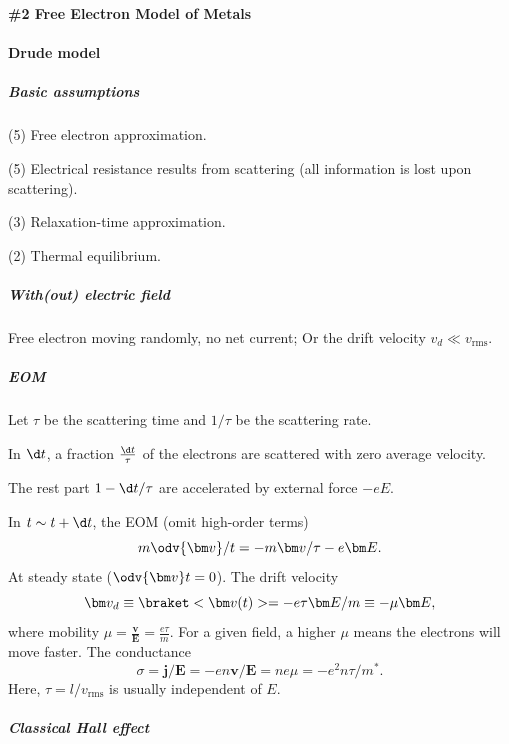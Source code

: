 
\begin{framed}\large\bfseries
  \#2 Free Electron Model of Metals
\end{framed}

\paragraph{Drude model}

\subparagraph{Basic assumptions}

\begin{enumext*}[nosep, columns = 5, label = (\alph*)]
  \item(5) Free electron approximation.
  \item(5) Electrical resistance results from scattering
  (all information is lost upon scattering).
  \item(3) Relaxation-time approximation.
  \item(2) Thermal equilibrium.
\end{enumext*}

\subparagraph{With(out) electric field}

Free electron moving randomly, no net current;
Or the drift velocity $v_d \ll v_\text{rms}$.

\subparagraph{EOM}

\begin{enumext}
  \item Let $\tau$ be the scattering time and $1/\tau$ be the scattering rate.
  \item In $\d t$, a fraction $\frac{\d t}\tau$ of the electrons are scattered
  with zero average velocity.
  \item The rest part $1 - \d t/\tau$ are accelerated by external force $-eE$.
  \item In $t \sim t + \d t$, the EOM (omit high-order terms)
  \[
    m\odv{\bm v}/t = -m\bm v/\tau - e\bm E.
  \]
  At steady state ($\odv{\bm v}t = 0$). The drift velocity
  \[
    \bm v_d \equiv \braket<\bm v(t)> = -e\tau\bm E/m \equiv -\mu\bm E,
  \]
  where mobility $\mu = \frac{\bm v}{\bm E} = \frac{e\tau}{m}$.
  For a given field, a higher $\mu$ means the electrons will move faster.
  The conductance
  \[
    \sigma = \bm j/\bm E
  = -en\bm v/\bm E = ne\mu = -e^2n\tau/m^*.
  \]
  Here, $\tau = l/v_\text{rms}$ is usually independent of $E$.
\end{enumext}

\subparagraph{Classical Hall effect}

